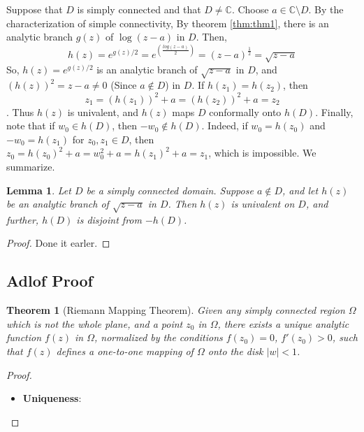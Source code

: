 \documentclass[
]{book}
\providecommand{\tightlist}{%
  \setlength{\itemsep}{0pt}\setlength{\parskip}{0pt}}
\newtheorem{theorem}{Theorem}[chapter]
\newtheorem{lemma}{Lemma}[chapter]
\theoremstyle{definition}
\theoremstyle{definition}
\theoremstyle{definition}
\theoremstyle{definition}
\theoremstyle{remark}
\begin{document}
Suppose that \(D\) is simply connected and that \(D \neq \mathbb{C}\). Choose \(a \in \mathbb{C} \setminus D\). By the characterization of simple connectivity,
By theorem \ref{thm:thm1}, there is an analytic branch \(g(z)\) of \(\log(z - a)\) in \(D\).
Then,
\[h(z) = e^{g(z)/2}=e^{\left(\frac{log(z-a)}{2}\right)}=(z-a)^{\frac{1}{2}}=\sqrt{z-a}\]
So, \(h(z) = e^{g(z)/2}\) is an analytic branch of \(\sqrt{z - a}\) in \(D\), and \((h(z))^2 = z - a \neq 0\) (Since \(a\not\in D\)) in \(D\). If \(h(z_1) = h(z_2)\), then \[z_1 = (h(z_1))^2 + a = (h(z_2))^2 + a = z_2\].
Thus \(h(z)\) is univalent, and \(h(z)\) maps \(D\) conformally onto \(h(D)\). Finally, note that if \(w_0 \in h(D)\), then \(-w_0 \notin h(D)\). Indeed, if \(w_0 = h(z_0)\) and \(-w_0 = h(z_1)\) for \(z_0, z_1 \in D\), then \(z_0 = h(z_0)^2 + a = w_0^2 + a = h(z_1)^2 + a = z_1\), which is impossible. We summarize.

\begin{lemma}
\protect\hypertarget{lem:unnamed-chunk-41}{}\label{lem:unnamed-chunk-41}Let \(D\) be a simply connected domain. Suppose \(a \notin D\), and let
\(h(z)\) be an analytic branch of \(\sqrt{z - a}\) in \(D\). Then \(h(z)\) is univalent on \(D\), and further, \(h(D)\) is disjoint from \(-h(D)\).
\end{lemma}

\begin{proof}
Done it earler.
\end{proof}

\subsection{Adlof Proof}\label{adlof-proof}

\begin{theorem}[Riemann Mapping Theorem]
\protect\hypertarget{thm:unnamed-chunk-43}{}\label{thm:unnamed-chunk-43}Given any simply connected region \(\Omega\) which is not the whole plane, and a point \(z_0\) in \(\Omega\), there exists a unique analytic function \(f(z)\) in \(\Omega\), normalized by the conditions \(f(z_0) = 0\), \(f'(z_0) > 0\), such that \(f(z)\) defines a one-to-one mapping of \(\Omega\) onto the disk \(|w| < 1\).
\end{theorem}

\begin{proof}
\leavevmode

\begin{itemize}
\tightlist
\item
  \textbf{Uniqueness}:
\end{itemize}

\end{proof}
\end{document}
